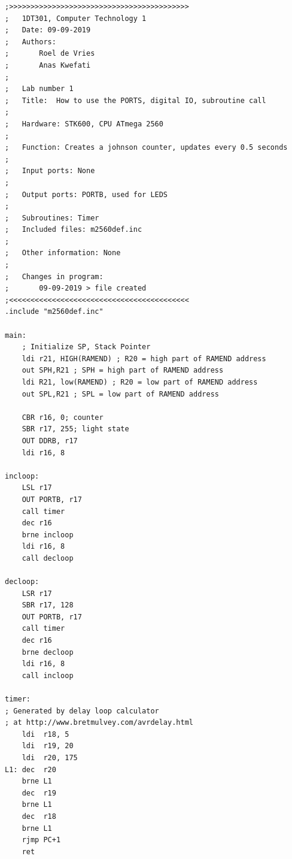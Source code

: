 \documentclass[a4paper,12pt]{article}
\begin{document}
\lstset{style=Asm}

\begin{lstlisting}
;>>>>>>>>>>>>>>>>>>>>>>>>>>>>>>>>>>>>>>>>>>
;	1DT301, Computer Technology 1
;	Date: 09-09-2019
;	Authors:
;		Roel de Vries
;		Anas Kwefati
;
;	Lab number 1
;	Title:	How to use the PORTS, digital IO, subroutine call
;
;	Hardware: STK600, CPU ATmega 2560
;
;	Function: Creates a johnson counter, updates every 0.5 seconds
;
;	Input ports: None
;
;	Output ports: PORTB, used for LEDS
;
;	Subroutines: Timer
;	Included files: m2560def.inc
;
;	Other information: None
;
;	Changes in program: 
;		09-09-2019 > file created
;<<<<<<<<<<<<<<<<<<<<<<<<<<<<<<<<<<<<<<<<<<
.include "m2560def.inc"

main:
	; Initialize SP, Stack Pointer
	ldi r21, HIGH(RAMEND) ; R20 = high part of RAMEND address
	out SPH,R21 ; SPH = high part of RAMEND address
	ldi R21, low(RAMEND) ; R20 = low part of RAMEND address
	out SPL,R21 ; SPL = low part of RAMEND address

	CBR r16, 0; counter
	SBR r17, 255; light state 
	OUT DDRB, r17
	ldi r16, 8

incloop:
	LSL r17
	OUT PORTB, r17
	call timer
	dec r16
    brne incloop
	ldi r16, 8
	call decloop

decloop:
	LSR r17
	SBR r17, 128
	OUT PORTB, r17
	call timer
	dec r16
    brne decloop
	ldi r16, 8
	call incloop

timer:
; Generated by delay loop calculator
; at http://www.bretmulvey.com/avrdelay.html
	ldi  r18, 5
    ldi  r19, 20
    ldi  r20, 175
L1: dec  r20
    brne L1
    dec  r19
    brne L1
    dec  r18
    brne L1
    rjmp PC+1
	ret

\end{lstlisting}




\end{document}
